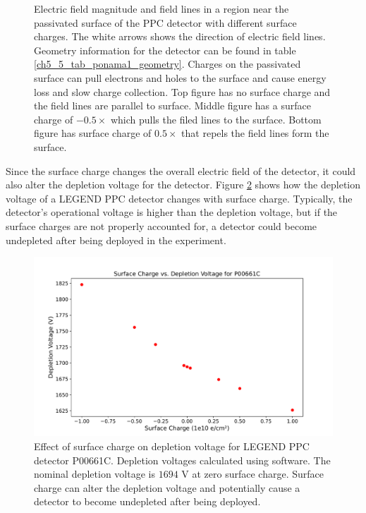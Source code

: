 \begin{figure}
\caption{Electric field magnitude and field lines in a region near the passivated surface of the {\ponama} PPC detector with different surface charges. The white arrows shows the direction of electric field lines. Geometry information for the detector can be found in table \ref{ch5_5_tab_ponama1_geometry}. Charges on the passivated surface can pull electrons and holes to the surface and cause energy loss and slow charge collection. Top figure has no surface charge and the field lines are parallel to surface. Middle figure has a surface charge of $-0.5\times${\scunit} which pulls the filed lines to the surface. Bottom figure has surface charge of $0.5\times${\scunit} that repels the field lines form the surface.}
\label{ch3_fig_surface_field_sc0}
\end{figure}

Since the surface charge changes the overall electric field of the detector, it could also alter the depletion voltage for the detector. Figure \ref{ch3_fig_deplection_sc} shows how the depletion voltage of a LEGEND PPC detector changes with surface charge. Typically, the detector's operational voltage is higher than the depletion voltage, but if the surface charges are not properly accounted for, a detector could become undepleted after being deployed in the experiment.

\begin{figure}[!htb]
\centering
\includegraphics[trim={1cm 0.4cm 1cm 1.75cm},clip,width=0.99\linewidth]{ch3/figs/deplep_sc.pdf}
 \caption{Effect of surface charge on depletion voltage for LEGEND PPC detector P00661C. Depletion voltages calculated using {\siggen} software. The nominal depletion voltage is $1694$ V at zero surface charge. Surface charge can alter the depletion voltage and potentially cause a detector to become undepleted after being deployed.
}
\label{ch3_fig_deplection_sc}
  \end{figure}

